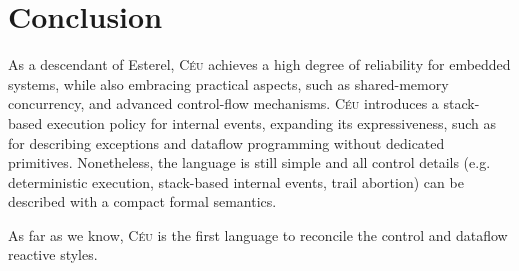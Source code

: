 \documentclass{acm_proc_article-sp}
\newcommand{\CEU}{\textsc{C\'{e}u}\xspace}
\newcommand{\1}{\;}
\newcommand{\2}{\;\;}
\newcommand{\3}{\;\;\;}
\newcommand{\5}{\;\;\;\;\;}
\begin{document}
\section{Conclusion}
\label{sec.conclusion}

As a descendant of Esterel, \CEU achieves a high degree of reliability for 
embedded systems, while also embracing practical aspects, such as
shared-memory concurrency, and advanced control-flow mechanisms.
%
\CEU introduces a stack-based execution policy for internal events, expanding 
its expressiveness, such as for describing exceptions and dataflow programming 
without dedicated primitives.
%
Nonetheless, the language is still simple and all control details (e.g. 
deterministic execution, stack-based internal events, trail abortion) can be 
described with a compact formal semantics.

As far as we know, \CEU is the first language to reconcile the control and 
dataflow reactive styles.

\end{document}
